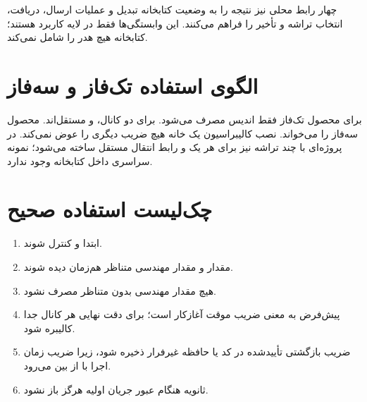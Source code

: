 چهار رابط محلی نیز نتیجه
را به وضعیت کتابخانه تبدیل و عملیات ارسال، دریافت، انتخاب تراشه و تأخیر را فراهم می‌کنند. این وابستگی‌ها فقط در لایه کاربرد هستند؛ کتابخانه
هیچ هدر  را شامل نمی‌کند.

\section{الگوی استفاده تک‌فاز و سه‌فاز}
برای محصول تک‌فاز فقط اندیس
مصرف می‌شود. برای دو کانال،  و  مستقل‌اند. محصول سه‌فاز  را می‌خواند. نصب کالیبراسیون یک خانه هیچ ضریب دیگری را عوض نمی‌کند. در پروژه‌ای با چند تراشه نیز برای هر  یک
و رابط انتقال مستقل ساخته می‌شود؛ نمونه سراسری داخل کتابخانه وجود ندارد.

\section{چک‌لیست استفاده صحیح}
\begin{enumerate}
  \item ابتدا  و  کنترل شوند.
  \item مقدار  و مقدار مهندسی متناظر هم‌زمان دیده شوند.
  \item هیچ مقدار مهندسی بدون  متناظر مصرف نشود.
  \item {} پیش‌فرض به معنی ضریب موقت آغازکار است؛ برای دقت نهایی هر کانال جدا کالیبره شود.
  \item ضریب بازگشتی تأییدشده در کد یا حافظه غیرفرار ذخیره شود، زیرا ضریب زمان اجرا با  از بین می‌رود.
  \item ثانویه  هنگام عبور جریان اولیه هرگز باز نشود.
\end{enumerate}
